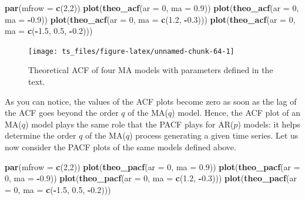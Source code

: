 \documentclass[]{book}
\newenvironment{Shaded}{\begin{snugshade}}{\end{snugshade}}
\newcommand{\KeywordTok}[1]{\textcolor[rgb]{0.13,0.29,0.53}{\textbf{#1}}}
\newcommand{\DataTypeTok}[1]{\textcolor[rgb]{0.13,0.29,0.53}{#1}}
\newcommand{\DecValTok}[1]{\textcolor[rgb]{0.00,0.00,0.81}{#1}}
\newcommand{\FloatTok}[1]{\textcolor[rgb]{0.00,0.00,0.81}{#1}}
\newcommand{\OperatorTok}[1]{\textcolor[rgb]{0.81,0.36,0.00}{\textbf{#1}}}
\newcommand{\NormalTok}[1]{#1}
\theoremstyle{definition}
\theoremstyle{definition}
\theoremstyle{definition}
\theoremstyle{remark}
\begin{document}
\begin{Shaded}
\begin{Highlighting}[]
\KeywordTok{par}\NormalTok{(}\DataTypeTok{mfrow =} \KeywordTok{c}\NormalTok{(}\DecValTok{2}\NormalTok{,}\DecValTok{2}\NormalTok{))}
\KeywordTok{plot}\NormalTok{(}\KeywordTok{theo_acf}\NormalTok{(}\DataTypeTok{ar =} \DecValTok{0}\NormalTok{, }\DataTypeTok{ma =} \FloatTok{0.9}\NormalTok{))}
\KeywordTok{plot}\NormalTok{(}\KeywordTok{theo_acf}\NormalTok{(}\DataTypeTok{ar =} \DecValTok{0}\NormalTok{, }\DataTypeTok{ma =} \OperatorTok{-}\FloatTok{0.9}\NormalTok{))}
\KeywordTok{plot}\NormalTok{(}\KeywordTok{theo_acf}\NormalTok{(}\DataTypeTok{ar =} \DecValTok{0}\NormalTok{, }\DataTypeTok{ma =} \KeywordTok{c}\NormalTok{(}\FloatTok{1.2}\NormalTok{, }\OperatorTok{-}\FloatTok{0.3}\NormalTok{)))}
\KeywordTok{plot}\NormalTok{(}\KeywordTok{theo_acf}\NormalTok{(}\DataTypeTok{ar =} \DecValTok{0}\NormalTok{, }\DataTypeTok{ma =} \KeywordTok{c}\NormalTok{(}\OperatorTok{-}\FloatTok{1.5}\NormalTok{, }\FloatTok{0.5}\NormalTok{, }\OperatorTok{-}\FloatTok{0.2}\NormalTok{)))}
\end{Highlighting}
\end{Shaded}

\begin{figure}

{\centering \texttt{[image: ts\_files/figure-latex/unnamed-chunk-64-1]} 

}

\caption{Theoretical ACF of four MA models with parameters defined in the text.}\label{fig:unnamed-chunk-64}
\end{figure}

As you can notice, the values of the ACF plots become zero as soon as
the lag of the ACF goes beyond the order \(q\) of the MA(\(q\)) model.
Hence, the ACF plot of an MA(\(q\)) model plays the same role that the
PACF plays for AR(\(p\)) models: it helps determine the order \(q\) of
the MA(\(q\)) process generating a given time series. Let us now
consider the PACF plots of the same models defined above.

\begin{Shaded}
\begin{Highlighting}[]
\KeywordTok{par}\NormalTok{(}\DataTypeTok{mfrow =} \KeywordTok{c}\NormalTok{(}\DecValTok{2}\NormalTok{,}\DecValTok{2}\NormalTok{))}
\KeywordTok{plot}\NormalTok{(}\KeywordTok{theo_pacf}\NormalTok{(}\DataTypeTok{ar =} \DecValTok{0}\NormalTok{, }\DataTypeTok{ma =} \FloatTok{0.9}\NormalTok{))}
\KeywordTok{plot}\NormalTok{(}\KeywordTok{theo_pacf}\NormalTok{(}\DataTypeTok{ar =} \DecValTok{0}\NormalTok{, }\DataTypeTok{ma =} \OperatorTok{-}\FloatTok{0.9}\NormalTok{))}
\KeywordTok{plot}\NormalTok{(}\KeywordTok{theo_pacf}\NormalTok{(}\DataTypeTok{ar =} \DecValTok{0}\NormalTok{, }\DataTypeTok{ma =} \KeywordTok{c}\NormalTok{(}\FloatTok{1.2}\NormalTok{, }\OperatorTok{-}\FloatTok{0.3}\NormalTok{)))}
\KeywordTok{plot}\NormalTok{(}\KeywordTok{theo_pacf}\NormalTok{(}\DataTypeTok{ar =} \DecValTok{0}\NormalTok{, }\DataTypeTok{ma =} \KeywordTok{c}\NormalTok{(}\OperatorTok{-}\FloatTok{1.5}\NormalTok{, }\FloatTok{0.5}\NormalTok{, }\OperatorTok{-}\FloatTok{0.2}\NormalTok{)))}
\end{Highlighting}
\end{Shaded}
\end{document}
